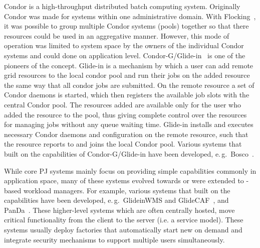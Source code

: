 \documentclass{sig-alternate}
\begin{document}
Condor is a high-throughput distributed batch computing system. Originally
Condor was made for systems within one administrative domain.
With Flocking~\cite{Epema:1996:flocking}, it was possible to group multiple
Condor systems (pools) together so that there resources could be used in an
aggregative manner.
However, this mode of operation was limited to system space by the owners of
the individual Condor systems and could done on application level.
Condor-G/Glide-in~\cite{condor-g} is one of the pioneers of the \pilotjob
concept.
Glide-in is a mechanism by which a user can add remote grid resources to the
local condor pool and run their jobs on the added resource the same way that
all condor jobs are submitted.
On the remote resource a set of Condor daemons is started, which then
registers the available job slots with the central Condor pool.  The
resources added are available only for the user who added the resource
to the pool, thus giving complete control over the resources for
managing jobs without any queue waiting time.  Glide-in installs and
executes necessary Condor daemons and configuration on the remote
resource, such that the resource reports to and joins the local Condor
pool. Various systems that built on the \pilot
capabilities of Condor-G/Glide-in have been developed, e.\,g.\
Bosco~\cite{bosco}.



While core PJ systems mainly focus on providing simple \pilot
capabilities commonly in application space, many of these systems
evolved towards or were extended to \pilot-based workload managers.
For example, various systems that built on the \pilot capabilities
have been developed, e.\,g.\ GlideinWMS and
GlideCAF~\cite{Belforte:2006:glidecaf}, and
PanDa~\cite{1742-6596-331-7-072069}.  These higher-level systems which
are often centrally hosted, move critical functionality from the
client to the server (i.e. a service model).  These systems usually
deploy \pilot factories that automatically start new \pilots on demand
and integrate security mechanisms to support multiple users
simultaneously.
\end{document}
